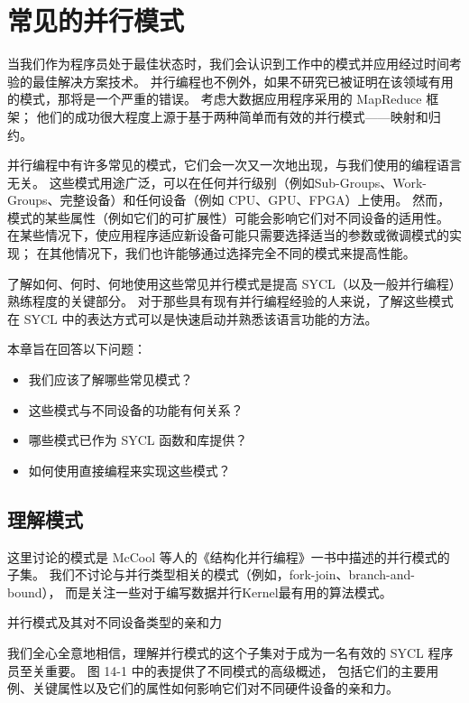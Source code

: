 \section{常见的并行模式}
当我们作为程序员处于最佳状态时，我们会认识到工作中的模式并应用经过时间考验的最佳解决方案技术。 
并行编程也不例外，如果不研究已被证明在该领域有用的模式，那将是一个严重的错误。 
考虑大数据应用程序采用的 MapReduce 框架； 他们的成功很大程度上源于基于两种简单而有效的并行模式——映射和归约。

并行编程中有许多常见的模式，它们会一次又一次地出现，与我们使用的编程语言无关。 
这些模式用途广泛，可以在任何并行级别（例如Sub-Groups、Work-Groups、完整设备）和任何设备（例如 CPU、GPU、FPGA）上使用。 
然而，模式的某些属性（例如它们的可扩展性）可能会影响它们对不同设备的适用性。 
在某些情况下，使应用程序适应新设备可能只需要选择适当的参数或微调模式的实现； 
在其他情况下，我们也许能够通过选择完全不同的模式来提高性能。

了解如何、何时、何地使用这些常见并行模式是提高 SYCL（以及一般并行编程）熟练程度的关键部分。 
对于那些具有现有并行编程经验的人来说，了解这些模式在 SYCL 中的表达方式可以是快速启动并熟悉该语言功能的方法。

本章旨在回答以下问题：

\begin{itemize}
	\item 我们应该了解哪些常见模式？

	\item 这些模式与不同设备的功能有何关系？

	\item 哪些模式已作为 SYCL 函数和库提供？

	\item 如何使用直接编程来实现这些模式？
\end{itemize}


\subsection{理解模式}
这里讨论的模式是 McCool 等人的《结构化并行编程》一书中描述的并行模式的子集。 
我们不讨论与并行类型相关的模式（例如，fork-join、branch-and-bound），
而是关注一些对于编写数据并行Kernel最有用的算法模式。

{\color{red} 并行模式及其对不同设备类型的亲和力}

我们全心全意地相信，理解并行模式的这个子集对于成为一名有效的 SYCL 程序员至关重要。 
图 14-1 中的表提供了不同模式的高级概述，
包括它们的主要用例、关键属性以及它们的属性如何影响它们对不同硬件设备的亲和力。

